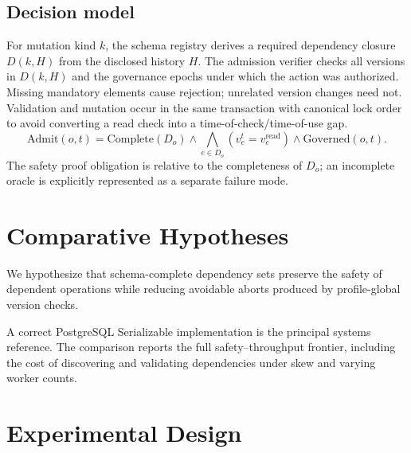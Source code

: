 \documentclass[11pt,a4paper]{article}
\begin{document}
\subsection{Decision model}
For mutation kind $k$, the schema registry derives a required dependency closure $D(k,H)$ from the disclosed history $H$. The admission verifier checks all versions in $D(k,H)$ and the governance epochs under which the action was authorized. Missing mandatory elements cause rejection; unrelated version changes need not. Validation and mutation occur in the same transaction with canonical lock order to avoid converting a read check into a time-of-check/time-of-use gap.
\begin{equation}
\mathrm{Admit}(o,t)=\mathrm{Complete}(D_o)\land
\bigwedge_{e\in D_o}(v_e^t=v_e^{\mathrm{read}})\land
\mathrm{Governed}(o,t).
\end{equation}
The safety proof obligation is relative to the completeness of $D_o$; an incomplete oracle is explicitly represented as a separate failure mode.

\section{Comparative Hypotheses}
We hypothesize that schema-complete dependency sets preserve the safety of dependent operations while reducing avoidable aborts produced by profile-global version checks.

A correct PostgreSQL Serializable implementation is the principal systems reference. The comparison reports the full safety--throughput frontier, including the cost of discovering and validating dependencies under skew and varying worker counts.

\section{Experimental Design}
\end{document}
